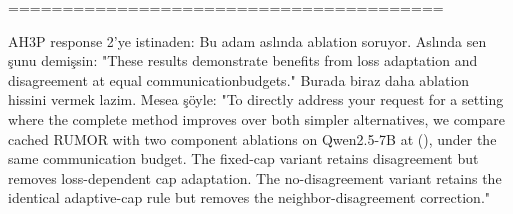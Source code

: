 ========================================  

AH3P response 2'ye istinaden: Bu adam aslında ablation soruyor. Aslında sen şunu demişsin: "These results demonstrate benefits from loss adaptation and disagreement at equal communicationbudgets." Burada biraz daha ablation hissini vermek lazim. Mesea şöyle: "To directly address your request for a setting where the complete method improves over both simpler alternatives, we compare cached RUMOR with two component ablations on Qwen2.5-7B at (), under the same communication budget. The fixed-cap variant retains disagreement but removes loss-dependent cap adaptation. The no-disagreement variant retains the identical adaptive-cap rule but removes the neighbor-disagreement correction."





